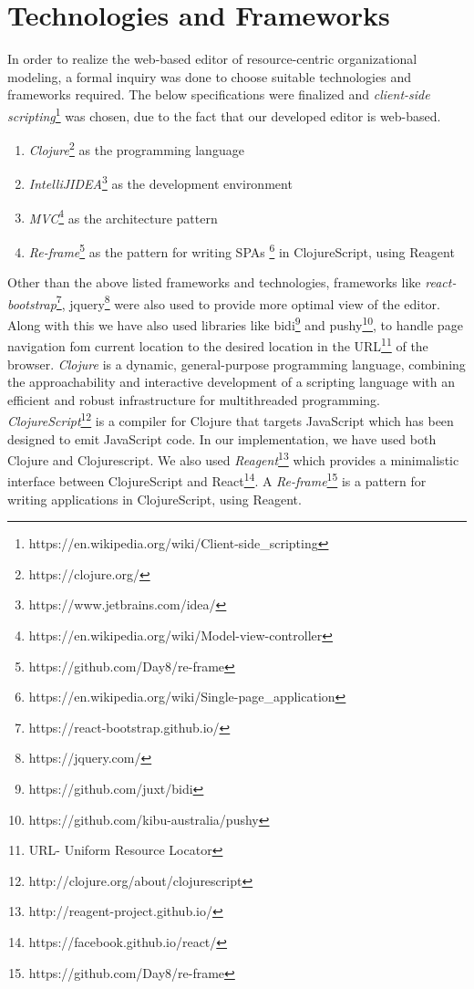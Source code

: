 \section{Technologies and Frameworks}
\label{subsec:specifications}
In order to realize the web-based editor of resource-centric organizational modeling, a formal inquiry was done to choose suitable technologies and frameworks required. The below specifications were finalized and \textit{client-side scripting}\footnote{https://en.wikipedia.org/wiki/Client-side\_scripting} was chosen, due to the fact that our developed editor is web-based. 

\begin{enumerate}   
	\item \textit{Clojure}\footnote{https://clojure.org/} as the programming language
	\item \textit{IntelliJIDEA}\footnote{https://www.jetbrains.com/idea/} as the development environment
	\item \textit{MVC}\footnote{https://en.wikipedia.org/wiki/Model-view-controller}  as the architecture pattern
	\item \textit{Re-frame}\footnote{https://github.com/Day8/re-frame} as the pattern for writing SPAs \footnote{https://en.wikipedia.org/wiki/Single-page\_application} in ClojureScript, using Reagent	
\end{enumerate}

Other than the above listed frameworks and technologies, frameworks like \textit{react-bootstrap}\footnote{https://react-bootstrap.github.io/}, jquery\footnote{https://jquery.com/} were also used to provide more optimal view of the editor. Along with this we have also used libraries like bidi\footnote{https://github.com/juxt/bidi} and pushy\footnote{https://github.com/kibu-australia/pushy}, to handle page navigation fom current location to the desired location in the URL\footnote{URL- Uniform Resource Locator} of the browser. \textit{Clojure} is a dynamic, general-purpose programming language, combining the approachability and interactive development of a scripting language with an efficient and robust infrastructure for multithreaded programming. \textit{ClojureScript}\footnote{http://clojure.org/about/clojurescript} is a compiler for Clojure that targets JavaScript which has been designed to emit JavaScript code. In our implementation, we have used both Clojure and Clojurescript. We also used \textit{Reagent}\footnote{http://reagent-project.github.io/} which provides a minimalistic interface between ClojureScript and React\footnote{https://facebook.github.io/react/}. A \textit{Re-frame}\footnote{https://github.com/Day8/re-frame} is a pattern for writing applications in ClojureScript, using Reagent.

